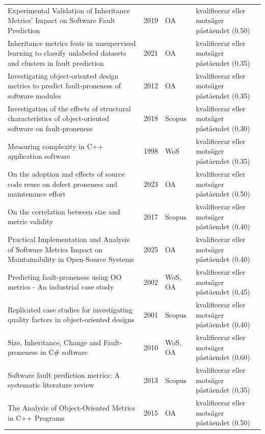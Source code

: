 \begin{longtable}{@{}%
  >{\raggedright\arraybackslash}p{}c%
  >{\raggedright\arraybackslash}p{}%
  >{\raggedright\arraybackslash}p{}@{}}
Experimental Validation of Inheritance Metrics' Impact on Software Fault Prediction & 2019 & OA & kvalificerar eller motsäger påståendet (0.50) \\
Inheritance metrics feats in unsupervised learning to classify unlabeled datasets and clusters in fault prediction & 2021 & OA & kvalificerar eller motsäger påståendet (0.35) \\
Investigating object-oriented design metrics to predict fault-proneness of software modules & 2012 & OA & kvalificerar eller motsäger påståendet (0.35) \\
Investigation of the effects of structural characteristics of object-oriented software on fault-proneness & 2018 & Scopus & kvalificerar eller motsäger påståendet (0.30) \\
Measuring complexity in C++ application software & 1998 & WoS & kvalificerar eller motsäger påståendet (0.35) \\
On the adoption and effects of source code reuse on defect proneness and maintenance effort & 2023 & OA & kvalificerar eller motsäger påståendet (0.50) \\
On the correlation between size and metric validity & 2017 & Scopus & kvalificerar eller motsäger påståendet (0.40) \\
Practical Implementation and Analysis of Software Metrics Impact on Maintainability in Open-Source Systems & 2025 & OA & kvalificerar eller motsäger påståendet (0.40) \\
Predicting fault-proneness using OO metrics - An industrial case study & 2002 & WoS, OA & kvalificerar eller motsäger påståendet (0.45) \\
Replicated case studies for investigating quality factors in object-oriented designs & 2001 & Scopus & kvalificerar eller motsäger påståendet (0.40) \\
Size, Inheritance, Change and Fault-proneness in C\# software & 2010 & WoS, OA & kvalificerar eller motsäger påståendet (0.60) \\
Software fault prediction metrics: A systematic literature review & 2013 & Scopus & kvalificerar eller motsäger påståendet (0.35) \\
The Analysis of Object-Oriented Metrics in C++ Programs & 2015 & OA & kvalificerar eller motsäger påståendet (0.50) \\
\end{longtable}
\endgroup
